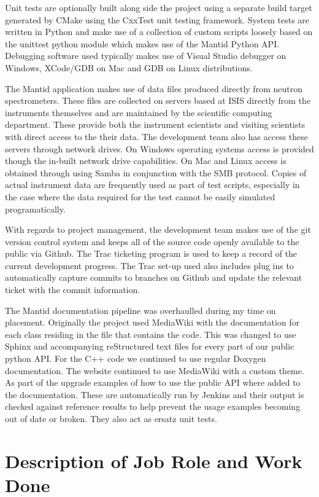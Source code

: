 \documentclass[paper=a4, fontsize=11pt]{scrartcl}	%
\numberwithin{equation}{section}															%
\numberwithin{figure}{section}																%
\numberwithin{table}{section}
\begin{document}
Unit tests are optionally built along side the project using a separate
build target generated by CMake using the CxxTest unit testing
framework. System tests are written in Python and make use of a
collection of custom scripts loosely based on the unittest python module
which makes use of the Mantid Python API. Debugging software used
typically makes use of Visual Studio debugger on Windows, XCode/GDB on
Mac and GDB on Linux distributions.

The Mantid application makes use of data files produced directly from
neutron spectrometers. These files are collected on servers based at
ISIS directly from the instruments themselves and are maintained by the
scientific computing department. These provide both the instrument
scientists and visiting scientists with direct access to the their data.
The development team also has access these servers through network
drives. On Windows operating systems access is provided though the
in-built network drive capabilities. On Mac and Linux access is obtained
through using Samba in conjunction with the SMB protocol. Copies of
actual instrument data are frequently used as part of test scripts,
especially in the case where the data required for the test cannot be
easily simulated programatically.

With regards to project management, the development team makes use of
the git version control system and keeps all of the source code openly
available to the public via Github. The Trac ticketing program is used
to keep a record of the current development progress. The Trac set-up
used also includes plug ins to automatically capture commits to branches
on Github and update the relevant ticket with the commit information.

The Mantid documentation pipeline was overhaulled during my time on placement. Originally the project used MediaWiki with the documentation for each class residing in the file that contains the code. This was changed to use Sphinx and accompanying reStructured text files for every part of our public python API. For the C++ code we continued to use regular Doxygen documentation. The website continued to use MediaWiki with a custom theme. As part of the upgrade examples of how to use the public API where added to the documentation. These are automatically run by Jenkins and their output is checked against reference results to help prevent the usage examples becoming out of date or broken. They also act as ersatz unit tests.

\clearpage
\section{Description of Job Role and Work
Done}\label{description-of-job-role-and-work-done}
\end{document}
